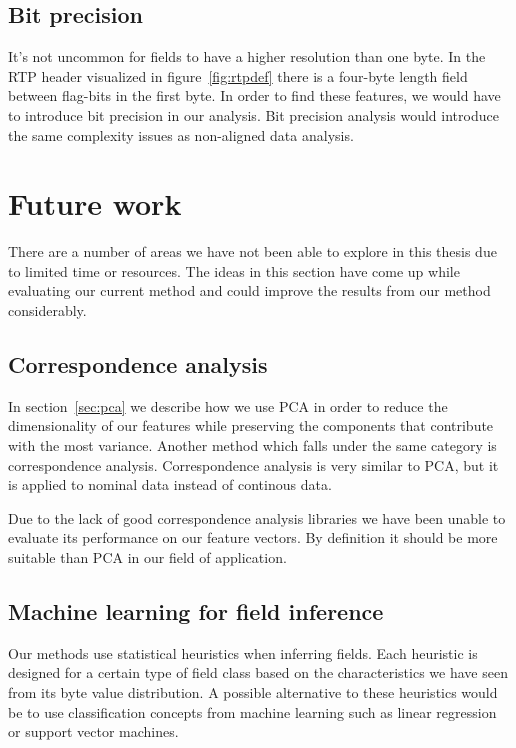 \documentclass[a4paper]{report}
\begin{document}
\subsection{Bit precision}
It's not uncommon for fields to have a higher resolution than one byte. In
the RTP header visualized in figure~\ref{fig:rtpdef} there is a four-byte
length field between flag-bits in the first byte. In order to find these
features, we would have to introduce bit precision in our analysis. Bit
precision analysis would introduce the same complexity issues as non-aligned
data analysis.


\section{Future work}
There are a number of areas we have not been able to explore in this thesis
due to limited time or resources. The ideas in this section have come up
while evaluating our current method and could improve the results from our
method considerably.

\subsection{Correspondence analysis}
In section~\ref{sec:pca} we describe how we use PCA in order to reduce the
dimensionality of our features while preserving the components that contribute
with the most variance. Another method which falls under the same category is
correspondence analysis. Correspondence analysis is very similar to PCA, but
it is applied to nominal data instead of continous data.

Due to the lack of good correspondence analysis libraries we have been unable
to evaluate its performance on our feature vectors. By definition it should
be more suitable than PCA in our field of application.

\subsection{Machine learning for field inference}
Our methods use statistical heuristics when inferring fields. Each heuristic
is designed for a certain type of field class based on the characteristics we
have seen from its byte value distribution. A possible alternative to these
heuristics would be to use classification concepts from machine learning such
as linear regression or support vector machines.
\end{document}
